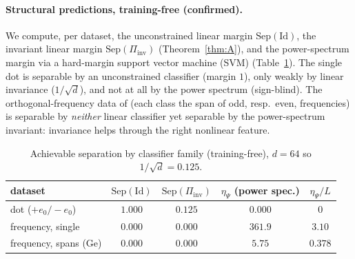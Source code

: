 \documentclass{article}
\theoremstyle{definition}
\newcommand{\Sep}{\mathrm{Sep}}
\newcommand{\dd}{d}
\begin{document}
\paragraph{Structural predictions, training-free (confirmed).} We compute, per dataset, the unconstrained linear margin $\Sep(\mathrm{Id})$, the invariant linear margin $\Sep(\Pi_{\mathrm{inv}})$ (Theorem~\ref{thm:A}), and the power-spectrum margin via a hard-margin support vector machine (SVM) (Table~\ref{tab:struct}). The single dot is separable by an unconstrained classifier (margin $1$), only weakly by linear invariance ($1/\sqrt\dd$), and not at all by the power spectrum (sign-blind). The orthogonal-frequency data of \citet{ge2021shift} (each class the span of odd, resp.\ even, frequencies) is separable by \emph{neither} linear classifier yet separable by the power-spectrum invariant: invariance helps through the right nonlinear feature.

\begin{table}[h]\centering
\caption{Achievable separation by classifier family (training-free), $\dd=64$ so $1/\sqrt\dd=0.125$.}
\label{tab:struct}
\begin{tabular}{lcccc}
\toprule
dataset & $\Sep(\mathrm{Id})$ & $\Sep(\Pi_{\mathrm{inv}})$ & $\eta_{\Psi}$ (power spec.) & $\eta_\Psi/L$ \\
\midrule
dot ($+e_0/-e_0$) & $1.000$ & $0.125$ & $0.000$ & $0$ \\
frequency, single & $0.000$ & $0.000$ & $361.9$ & $3.10$ \\
frequency, spans (Ge) & $0.000$ & $0.000$ & $5.75$ & $0.378$ \\
\bottomrule
\end{tabular}
\end{table}
\end{document}
